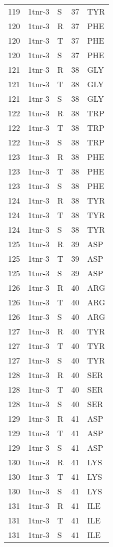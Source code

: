 \begin{longtable}[l]{l|l|l|l|l}
	119 & 1tnr-3 & S & 37 & TYR \\
	120 & 1tnr-3 & R & 37 & PHE \\
	120 & 1tnr-3 & T & 37 & PHE \\
	120 & 1tnr-3 & S & 37 & PHE \\
	121 & 1tnr-3 & R & 38 & GLY \\
	121 & 1tnr-3 & T & 38 & GLY \\
	121 & 1tnr-3 & S & 38 & GLY \\
	122 & 1tnr-3 & R & 38 & TRP \\
	122 & 1tnr-3 & T & 38 & TRP \\
	122 & 1tnr-3 & S & 38 & TRP \\
	123 & 1tnr-3 & R & 38 & PHE \\
	123 & 1tnr-3 & T & 38 & PHE \\
	123 & 1tnr-3 & S & 38 & PHE \\
	124 & 1tnr-3 & R & 38 & TYR \\
	124 & 1tnr-3 & T & 38 & TYR \\
	124 & 1tnr-3 & S & 38 & TYR \\
	125 & 1tnr-3 & R & 39 & ASP \\
	125 & 1tnr-3 & T & 39 & ASP \\
	125 & 1tnr-3 & S & 39 & ASP \\
	126 & 1tnr-3 & R & 40 & ARG \\
	126 & 1tnr-3 & T & 40 & ARG \\
	126 & 1tnr-3 & S & 40 & ARG \\
	127 & 1tnr-3 & R & 40 & TYR \\
	127 & 1tnr-3 & T & 40 & TYR \\
	127 & 1tnr-3 & S & 40 & TYR \\
	128 & 1tnr-3 & R & 40 & SER \\
	128 & 1tnr-3 & T & 40 & SER \\
	128 & 1tnr-3 & S & 40 & SER \\
	129 & 1tnr-3 & R & 41 & ASP \\
	129 & 1tnr-3 & T & 41 & ASP \\
	129 & 1tnr-3 & S & 41 & ASP \\
	130 & 1tnr-3 & R & 41 & LYS \\
	130 & 1tnr-3 & T & 41 & LYS \\
	130 & 1tnr-3 & S & 41 & LYS \\
	131 & 1tnr-3 & R & 41 & ILE \\
	131 & 1tnr-3 & T & 41 & ILE \\
	131 & 1tnr-3 & S & 41 & ILE \\

\end{longtable}
